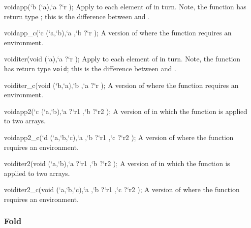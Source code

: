 \begin{defun2}{void}{app}{(`b (`a),`a {?}`r );}
  Apply  to each element of  in turn.  Note, the
  function  has return type ; this is the difference
  between  and .
\end{defun2}

\begin{defun2}{void}{app_c}{(`c (`a,`b),`a ,`b {?}`r );}
  A version of  where the function requires an environment.
\end{defun2}

\begin{defun2}{void}{iter}{(void (`a),`a {?}`r );}
  Apply  to each element of  in turn.  Note, the
  function  has return type \texttt{void}; this is the
  difference between  and .
\end{defun2}

\begin{defun2}{void}{iter_c}{(void (`b,`a),`b ,`a {?}`r );}
  A version of  where the function requires an environment.
\end{defun2}


\begin{defun2}{void}{app2}{(`c (`a,`b),`a {?}`r1 ,`b {?}`r2 );}
  A version of  in which the function is applied to two arrays.
\end{defun2}


\begin{defun2}{void}{app2_c}{(`d (`a,`b,`c),`a ,`b {?}`r1 ,`c {?}`r2 );}
  A version of  where the function requires an environment.
\end{defun2}


\begin{defun2}{void}{iter2}{(void (`a,`b),`a {?}`r1 ,`b {?}`r2 );}
  A version of  in which the function is applied to two arrays.
\end{defun2}


\begin{defun2}{void}{iter2_c}{(void (`a,`b,`c),`a ,`b {?}`r1 ,`c {?}`r2 );}
  A version of  where the function requires an environment.
\end{defun2}


\subsubsection*{Fold}

